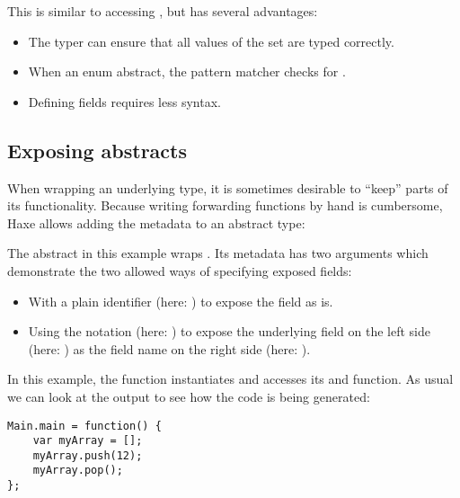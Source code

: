 \documentclass{haxe}
\begin{document}
This is similar to accessing , but has several advantages:

\begin{itemize}
	\item The typer can ensure that all values of the set are typed correctly.
	\item When  an enum abstract, the pattern matcher checks for .
	\item Defining fields requires less syntax.
\end{itemize}

\subsection{Exposing abstracts}
\label{types-abstract-expose}

When wrapping an underlying type, it is sometimes desirable to ``keep'' parts of its functionality. Because writing forwarding functions by hand is cumbersome, Haxe allows adding the  metadata to an abstract type:


The  abstract in this example wraps . Its  metadata has two arguments which demonstrate the two allowed ways of specifying exposed fields:

\begin{itemize}
	\item With a plain identifier (here: ) to expose the field as is.
	\item Using the \expr{=>} notation (here: ) to expose the underlying field on the left side (here: ) as the field name on the right side (here: ).
\end{itemize}

In this example, the  function instantiates  and accesses its  and  function. As usual we can look at the  output to see how the code is being generated:

\begin{lstlisting}
Main.main = function() {
	var myArray = [];
	myArray.push(12);
	myArray.pop();
};
\end{lstlisting}

\end{document}
